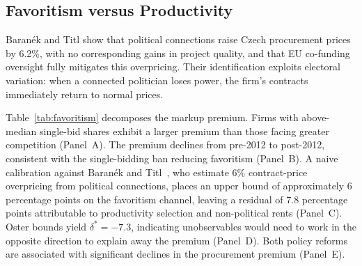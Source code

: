 \documentclass[11pt]{article}
\begin{document}
\subsection{Favoritism versus Productivity}\label{sec:favoritism}

Baran\'{e}k and Titl \cite{BaranekTitl2024} show that political connections raise Czech procurement prices by 6.2\%, with no corresponding gains in project quality, and that EU co-funding oversight fully mitigates this overpricing. Their identification exploits electoral variation: when a connected politician loses power, the firm's contracts immediately return to normal prices.



Table~\ref{tab:favoritism} decomposes the markup premium. Firms with above-median single-bid shares exhibit a larger premium than those facing greater competition (Panel~A). The premium declines from pre-2012 to post-2012, consistent with the single-bidding ban reducing favoritism (Panel~B). A naive calibration against Baran\'{e}k and Titl~\cite{BaranekTitl2024}, who estimate 6\% contract-price overpricing from political connections, places an upper bound of approximately 6 percentage points on the favoritism channel, leaving a residual of 7.8 percentage points attributable to productivity selection and non-political rents (Panel~C). Oster \cite{Oster2019} bounds yield $\delta^* = -7.3$, indicating unobservables would need to work in the opposite direction to explain away the premium (Panel~D). Both policy reforms are associated with significant declines in the procurement premium (Panel~E).
\end{document}
